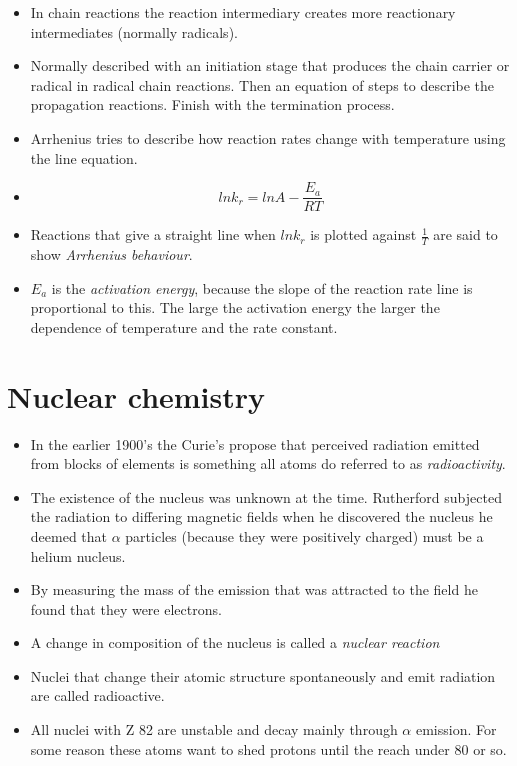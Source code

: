 \documentclass[12pt]{article}
\begin{document}
\begin{itemize}
\item
  In chain reactions the reaction intermediary creates more reactionary
  intermediates (normally radicals).
\item
  Normally described with an initiation stage that produces the chain
  carrier or radical in radical chain reactions. Then an equation of
  steps to describe the propagation reactions. Finish with the
  termination process.
\end{itemize}

\begin{itemize}
\item
  Arrhenius tries to describe how reaction rates change with temperature
  using the line equation.
\item
  \[lnk_r = lnA - \frac{E_a}{RT}\]
\item
  Reactions that give a straight line when \(lnk_r\) is plotted against
  \(\frac{1}{T}\) are said to show \emph{Arrhenius behaviour}.
\item
  \(E_a\) is the \emph{activation energy}, because the slope of the
  reaction rate line is proportional to this. The large the activation
  energy the larger the dependence of temperature and the rate constant.
\end{itemize}

\section{Nuclear chemistry}\label{nuclear-chemistry}

\begin{itemize}
\item
  In the earlier 1900's the Curie's propose that perceived radiation
  emitted from blocks of elements is something all atoms do referred to
  as \emph{radioactivity}.
\item
  The existence of the nucleus was unknown at the time. Rutherford
  subjected the radiation to differing magnetic fields when he
  discovered the nucleus he deemed that \(\alpha\) particles (because
  they were positively charged) must be a helium nucleus.
\item
  By measuring the mass of the emission that was attracted to the field
  he found that they were electrons.
\item
  A change in composition of the nucleus is called a \emph{nuclear
  reaction}
\item
  Nuclei that change their atomic structure spontaneously and emit
  radiation are called radioactive.
\item All nuclei with Z 82 are unstable and decay mainly through \(\alpha\)
    emission. For some reason these atoms want to shed protons until the reach
    under 80 or so.
\end{itemize}
\end{document}
